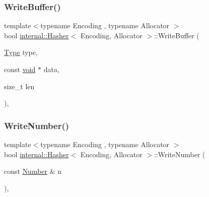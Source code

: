 \mbox{\label{classinternal_1_1Hasher_a028d5bf406cea4ae85678f454aacc6ee}} 
\subsubsection{\texorpdfstring{Write\+Buffer()}{WriteBuffer()}}
{\footnotesize\ttfamily template$<$typename Encoding , typename Allocator $>$ \\
bool \hyperlink{classinternal_1_1Hasher}{internal\+::\+Hasher}$<$ Encoding, Allocator $>$\+::Write\+Buffer (\begin{DoxyParamCaption}\item[{\hyperlink{rapidjson_8h_a1d1cfd8ffb84e947f82999c682b666a7}{Type}}]{type,  }\item[{const \hyperlink{imgui__impl__opengl3__loader_8h_ac668e7cffd9e2e9cfee428b9b2f34fa7}{void} $\ast$}]{data,  }\item[{size\+\_\+t}]{len }\end{DoxyParamCaption})\hspace{0.3cm}{\ttfamily [inline]}, {\ttfamily [private]}}

\mbox{\label{classinternal_1_1Hasher_abf8802d137174e04ec9975fbbf1075e1}} 
\subsubsection{\texorpdfstring{Write\+Number()}{WriteNumber()}}
{\footnotesize\ttfamily template$<$typename Encoding , typename Allocator $>$ \\
bool \hyperlink{classinternal_1_1Hasher}{internal\+::\+Hasher}$<$ Encoding, Allocator $>$\+::Write\+Number (\begin{DoxyParamCaption}\item[{const \hyperlink{structinternal_1_1Hasher_1_1Number}{Number} \&}]{n }\end{DoxyParamCaption})\hspace{0.3cm}{\ttfamily [inline]}, {\ttfamily [private]}}

\mbox{\label{classinternal_1_1Hasher_af104a27e689e3771872cbf271dc34914}} 

